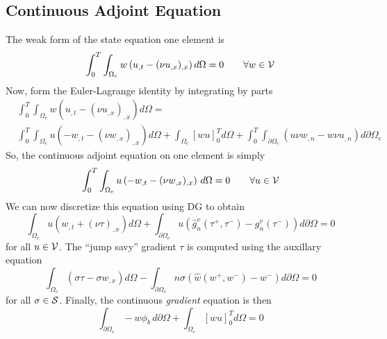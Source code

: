 \documentclass[12pt]{article}
\begin{document}
\subsection{Continuous Adjoint Equation}
The weak form of the state equation one element is
\begin{equation}
\int_0^T \int_{\Omega_e} w \left( u_{,t} - (\nu u_{,x})_{,x} \right) 
d\Omega = 0 \qquad \forall w\in{\cal V}
\end{equation}
Now, form the Euler-Lagrange identity by integrating by parts
\begin{eqnarray}
& \int_0^T \int_{\Omega_e} w \left( u_{,t} - 
  (\nu u_{,x})_{,x} \right) d\Omega =  \nonumber \\ 
& \int_0^T \int_{\Omega_e} u \left( -w_{,t} - 
  (\nu w_{,x})_{,x} \right) d\Omega +
  \int_{\Omega_e} \left[ w u \right]_0^T d\Omega + 
  \int_0^T\int_{\partial\Omega_e} 
  \left( u \nu w_{,n} - w \nu u_{,n} \right) d\partial\Omega_e 
\end{eqnarray}
So, the continuous adjoint equation on one element is simply
\begin{equation}
\int_0^T \int_{\Omega_e} u \left( -w_{,t} - 
  (\nu w_{,x})_{,x} \right) \, d\Omega = 0  \qquad \forall u\in{\cal V}
\end{equation}
We can now discretize this equation using DG to obtain
\begin{equation}
\int_{\Omega_e} u \left( w_{,t} + (\nu\tau)_{,x} \right) d\Omega +
\int_{\partial\Omega_e} u \left( \hat g^v_n(\tau^+,\tau^-) - 
                                 g^v_n(\tau^-) \right) d\partial\Omega = 0
\end{equation}
for all $u \in {\cal V}$.  The ``jump savy'' gradient $\tau$ is computed
using the auxillary equation
\begin{equation}
 \int_{\Omega_e} \left( \sigma\tau - \sigma w_{,x} \right) d\Omega -
 \int_{\partial\Omega_e} n \sigma\left( \hat w(w^+,w^-) - w^- \right) 
 d\partial\Omega = 0
\end{equation}
for all $\sigma \in {\cal S}$. Finally, the continuous {\em gradient} equation
is then
\begin{equation}
\int_{\partial\Omega_e} -w \phi_b \, d\partial\Omega + 
\int_{\Omega_e} \left[ w u \right]_0^T d\Omega = 0
\end{equation}
\end{document}

